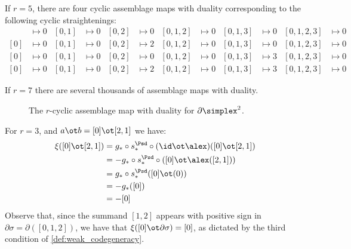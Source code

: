 \begin{example}\label{example:asymmetries5}
	If $r=5$, there are four cyclic assemblage maps with duality corresponding to the following cyclic straightenings:
	\begin{align*}
		[0]&\mapsto 0 & [0,1]&\mapsto 0 & [0,2]&\mapsto 0 & [0,1,2]&\mapsto 0 & [0,1,3] & \mapsto 0 & [0,1,2,3] & \mapsto 0 \\
		[0]&\mapsto 0 & [0,1]&\mapsto 0 & [0,2]&\mapsto 2 & [0,1,2]&\mapsto 0 & [0,1,3] & \mapsto 0 & [0,1,2,3] & \mapsto 0 \\
		[0]&\mapsto 0 & [0,1]&\mapsto 0 & [0,2]&\mapsto 0 & [0,1,2]&\mapsto 0 & [0,1,3] & \mapsto 3 & [0,1,2,3] & \mapsto 0 \\
		[0]&\mapsto 0 & [0,1]&\mapsto 0 & [0,2]&\mapsto 2 & [0,1,2]&\mapsto 0 & [0,1,3] & \mapsto 3 & [0,1,2,3] & \mapsto 0
	\end{align*}
\end{example}

If $r=7$ there are several thousands of assemblage maps with duality.

\begin{figure}
	\caption{The $r$-cyclic assemblage map with duality for $\partial \simplex^2$.}
\end{figure}

\begin{example}\label{example:f3_1}
	For $r=3$, and $a \ot b = [0] \ot [2,1]$ we have:
	\begin{align*}
		\xi([0] \ot [2,1])
		&= g_*\circ s_*^{\Psd}\circ (\id\ot \alex)([0] \ot [2,1])
		\\
		&= -g_*\circ s_*^{\Psd}\circ ([0] \ot \alex([2,1]))
		\\
		&= g_*\circ s_*^{\Psd}([0] \ot (0))
		\\
		&= -g_*([0])
		\\
		&= -[0]
	\end{align*}
	Observe that, since the summand $[1,2]$ appears with positive sign in $\partial \sigma = \partial([0,1,2])$, we have that $\xi([0] \ot \partial\sigma) = [0]$, as dictated by the third condition of \cref{def:weak_codegeneracy}.
\end{example}

